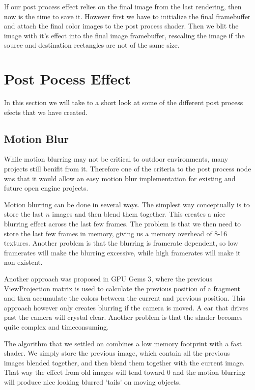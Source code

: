 
If our post process effect relies on the final image from the last
rendering, then now is the time to save it. However first we have to
initialize the final framebuffer and attach the final color images to
the post process shader. Then we blit the image with it's effect into
the final image framebuffer, rescaling the image if the source and
destination rectangles are not of the same size.


\section{Post Pocess Effect}

In this section we will take to a short look at some of the different
post process efects that we have created.

\subsection{Motion Blur}


While motion blurring may not be critical to outdoor environments,
many projects still benifit from it. Therefore one of the criteria
to the post process node was that it would allow an easy motion blur
implementation for existing and future open engine projects.

Motion blurring can be done in several ways. The simplest way
conceptually is to store the last $n$ images and then blend them
together. This creates a nice blurring effect across the last few
frames. The problem is that we then need to store the last few frames
in memory, giving us a memory overhead of 8-16 textures. Another
problem is that the blurring is framerate dependent, so low framerates
will make the blurring excessive, while high framerates will make it
non existent.

Another approach was proposed in GPU Gems 3, where the previous
ViewProjection matrix is used to calculate the previous position of a
fragment and then accumulate the colors between the current and
previous position. This approach however only creates blurring if the
camera is moved. A car that drives past the camera will crystal
clear. Another problem is that the shader becomes quite complex and
timeconsuming.

The algorithm that we settled on combines a low memory footprint with
a fast shader. We simply store the previous image, which contain all
the previous images blended together, and then blend them together
with the current image. That way the effect from old images will tend
toward 0 and the motion blurring will produce nice looking blurred
'tails' on moving objects.

